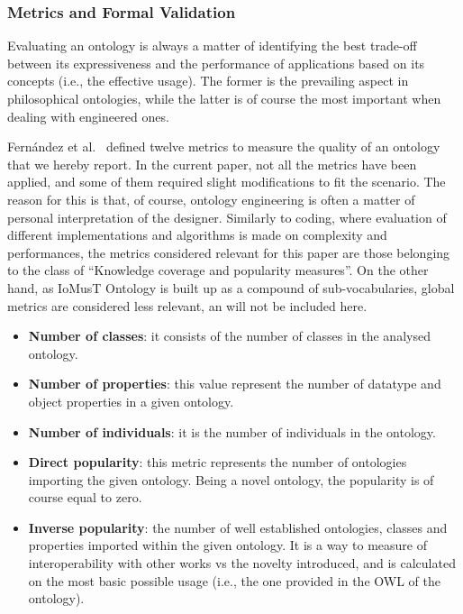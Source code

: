 \subsubsection{\textsf{Metrics and Formal Validation}}



Evaluating an ontology is always a matter of identifying the best trade-off between its expressiveness and the performance of applications based on its concepts (i.e., the effective usage). The former is the prevailing aspect in philosophical ontologies, while the latter is of course the most important when dealing with engineered ones.

Fern\'andez et al.~\cite{fernandez2009what} defined twelve metrics to measure the quality of an ontology that we hereby report. In the current paper, not all the metrics have been applied, and some of them required slight modifications to fit the scenario. The reason for this is that, of course, ontology engineering is often a matter of personal interpretation of the designer. Similarly to coding, where evaluation of different implementations and algorithms is made on complexity and performances, the metrics considered relevant for this paper are those belonging to the class of ``Knowledge coverage and popularity measures''. On the other hand, as IoMusT Ontology is built up as a compound of sub-vocabularies, global metrics are considered less relevant, an will not be included here. 

\begin{itemize}
    \item \textbf{Number of classes}: it consists of the number of classes in the analysed ontology. 
    \item \textbf{Number of properties}: this value represent the number of datatype and object properties in a given ontology. 
    \item \textbf{Number of individuals}: it is the number of individuals in the ontology.
    \item \textbf{Direct popularity}: this metric represents the number of ontologies importing the given ontology. Being a novel ontology, the popularity is of course equal to zero.
    \item \textbf{Inverse popularity}: the number of well established ontologies, classes and properties imported within the given ontology. It is a way to measure of interoperability with other works vs the novelty introduced, and is calculated on the most basic possible usage (i.e., the one provided in the OWL of the ontology). 
\end{itemize}

